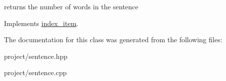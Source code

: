 returns the number of words in the sentence 

Implements \hyperlink{classindex__item_ae8ccce55ab973b1a2faa99df65e19051}{index\+\_\+item}.



The documentation for this class was generated from the following files\+:\begin{DoxyCompactItemize}
\item 
project/sentence.\+hpp\item 
project/sentence.\+cpp\end{DoxyCompactItemize}
